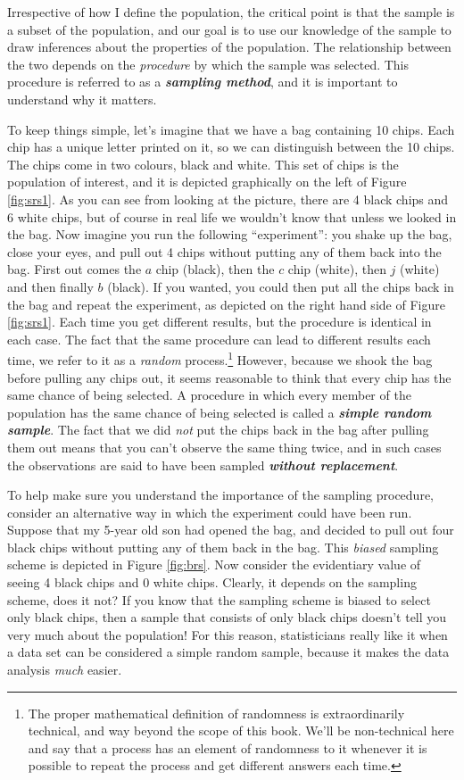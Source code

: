 \documentclass[
]{book}
\begin{document}
Irrespective of how I define the population, the critical point is that the sample is a subset of the population, and our goal is to use our knowledge of the sample to draw inferences about the properties of the population. The relationship between the two depends on the \emph{procedure} by which the sample was selected. This procedure is referred to as a \textbf{\emph{sampling method}}, and it is important to understand why it matters.

To keep things simple, let's imagine that we have a bag containing 10 chips. Each chip has a unique letter printed on it, so we can distinguish between the 10 chips. The chips come in two colours, black and white. This set of chips is the population of interest, and it is depicted graphically on the left of Figure \ref{fig:srs1}. As you can see from looking at the picture, there are 4 black chips and 6 white chips, but of course in real life we wouldn't know that unless we looked in the bag. Now imagine you run the following ``experiment'': you shake up the bag, close your eyes, and pull out 4 chips without putting any of them back into the bag. First out comes the \(a\) chip (black), then the \(c\) chip (white), then \(j\) (white) and then finally \(b\) (black). If you wanted, you could then put all the chips back in the bag and repeat the experiment, as depicted on the right hand side of Figure \ref{fig:srs1}. Each time you get different results, but the procedure is identical in each case. The fact that the same procedure can lead to different results each time, we refer to it as a \emph{random} process.\footnote{The proper mathematical definition of randomness is extraordinarily technical, and way beyond the scope of this book. We'll be non-technical here and say that a process has an element of randomness to it whenever it is possible to repeat the process and get different answers each time.} However, because we shook the bag before pulling any chips out, it seems reasonable to think that every chip has the same chance of being selected. A procedure in which every member of the population has the same chance of being selected is called a \textbf{\emph{simple random sample}}. The fact that we did \emph{not} put the chips back in the bag after pulling them out means that you can't observe the same thing twice, and in such cases the observations are said to have been sampled \textbf{\emph{without replacement}}.

To help make sure you understand the importance of the sampling procedure, consider an alternative way in which the experiment could have been run. Suppose that my 5-year old son had opened the bag, and decided to pull out four black chips without putting any of them back in the bag. This \emph{biased} sampling scheme is depicted in Figure \ref{fig:brs}. Now consider the evidentiary value of seeing 4 black chips and 0 white chips. Clearly, it depends on the sampling scheme, does it not? If you know that the sampling scheme is biased to select only black chips, then a sample that consists of only black chips doesn't tell you very much about the population! For this reason, statisticians really like it when a data set can be considered a simple random sample, because it makes the data analysis \emph{much} easier.
\end{document}
